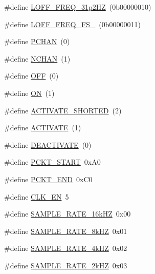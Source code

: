 \begin{DoxyCompactItemize}
\#define \hyperlink{group___definitions___a_d_s1299_ga39701cbaad5955197512c40d8bcc9da2}{L\+O\+F\+F\+\_\+\+F\+R\+E\+Q\+\_\+31p2\+H\+Z}~(0b00000010)
\item 
\#define \hyperlink{group___definitions___a_d_s1299_gacd0137898658760009f19c444fd2f59e}{L\+O\+F\+F\+\_\+\+F\+R\+E\+Q\+\_\+\+F\+S\+\_}~(0b00000011)
\item 
\#define \hyperlink{group___definitions___a_d_s1299_ga71feb0c2320860e512aebc5abe2cb1b3}{P\+C\+H\+A\+N}~(0)
\item 
\#define \hyperlink{group___definitions___a_d_s1299_ga3e9ad0441ab60e69a8b9d23efd7ddde8}{N\+C\+H\+A\+N}~(1)
\item 
\#define \hyperlink{group___definitions___a_d_s1299_ga29e413f6725b2ba32d165ffaa35b01e5}{O\+F\+F}~(0)
\item 
\#define \hyperlink{group___definitions___a_d_s1299_gad76d1750a6cdeebd506bfcd6752554d2}{O\+N}~(1)
\item 
\#define \hyperlink{group___definitions___a_d_s1299_gadcee793b764f63895383331bffe29b1e}{A\+C\+T\+I\+V\+A\+T\+E\+\_\+\+S\+H\+O\+R\+T\+E\+D}~(2)
\item 
\#define \hyperlink{group___definitions___a_d_s1299_gad37ed8e28abe573e992766b0e3b0353b}{A\+C\+T\+I\+V\+A\+T\+E}~(1)
\item 
\#define \hyperlink{group___definitions___a_d_s1299_ga45ceaefea6a74320666e61625ad5828a}{D\+E\+A\+C\+T\+I\+V\+A\+T\+E}~(0)
\item 
\#define \hyperlink{group___definitions___a_d_s1299_ga461cad1fadef8548ad129e8700decfca}{P\+C\+K\+T\+\_\+\+S\+T\+A\+R\+T}~0x\+A0
\item 
\#define \hyperlink{group___definitions___a_d_s1299_ga0cac8dd4e871f38cb9edbac7f06e5d33}{P\+C\+K\+T\+\_\+\+E\+N\+D}~0x\+C0
\item 
\#define \hyperlink{group___definitions___a_d_s1299_ga9303a043ca7b266ef138d3d55838cd65}{C\+L\+K\+\_\+\+E\+N}~5
\item 
\#define \hyperlink{group___definitions___a_d_s1299_gaafc8f010facb69d94f4e38a078900782}{S\+A\+M\+P\+L\+E\+\_\+\+R\+A\+T\+E\+\_\+16k\+H\+Z}~0x00
\item 
\#define \hyperlink{group___definitions___a_d_s1299_ga3be7f17be458cc71b84a37a308319131}{S\+A\+M\+P\+L\+E\+\_\+\+R\+A\+T\+E\+\_\+8k\+H\+Z}~0x01
\item 
\#define \hyperlink{group___definitions___a_d_s1299_ga7babfa2256b7721befe2ff02872a769c}{S\+A\+M\+P\+L\+E\+\_\+\+R\+A\+T\+E\+\_\+4k\+H\+Z}~0x02
\item 
\#define \hyperlink{group___definitions___a_d_s1299_ga034579cb2bb08a53b7342ba6c4b5a7f8}{S\+A\+M\+P\+L\+E\+\_\+\+R\+A\+T\+E\+\_\+2k\+H\+Z}~0x03

\end{DoxyCompactItemize}
